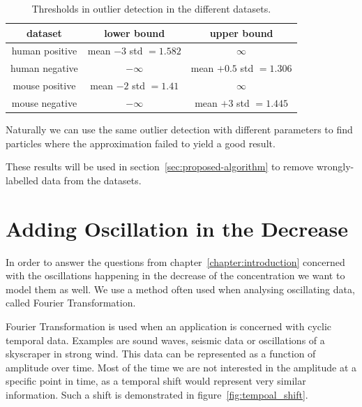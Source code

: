 \begin{table}[h!]
	\centering
	\begin{tabular}{|c|c|c|}
		\hline
		dataset & lower bound & upper bound \\
		\hline
		human positive & mean $ - 3$ std $ = 1.582$ & $\infty$ \\
		\hline
		human negative & $-\infty$ & mean $ + 0.5$ std $ = 1.306$ \\
		\hline
		mouse positive & mean $ - 2$ std $ = 1.41$ & $\infty$ \\
		\hline
		mouse negative & $-\infty$ & mean $ + 3$ std $ = 1.445$ \\
		\hline
	\end{tabular}
	\caption{Thresholds in outlier detection in the different datasets.}
	\label{tab:threshold_outlier}
\end{table}

Naturally we can use the same outlier detection with different parameters to find particles where the approximation failed to yield a good result.

These results will be used in section~\ref{sec:proposed-algorithm} to remove wrongly-labelled data from the datasets.

\section{Adding Oscillation in the Decrease}

In order to answer the questions from chapter~\ref{chapter:introduction} concerned with the oscillations  happening in the decrease of the \Calcium concentration we want to model them as well. We use a method often used when analysing oscillating data, called Fourier Transformation.

Fourier Transformation is used when an application is concerned with cyclic temporal data. Examples are sound waves, seismic data or oscillations of a skyscraper in strong wind. This data can be represented as a function of amplitude over time. Most of the time we are not interested in the amplitude at a specific point in time, as a temporal shift would represent very similar information. Such a shift is demonstrated in figure~\ref{fig:tempoal_shift}.


